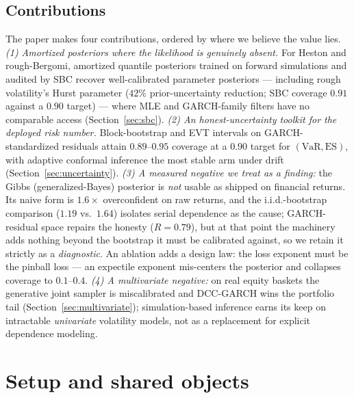 \documentclass[11pt]{article}
\newcommand{\VaR}{\mathrm{VaR}}
\newcommand{\ES}{\mathrm{ES}}
\theoremstyle{remark}
\begin{document}
\subsection{Contributions}\label{sec:contributions}
The paper makes four contributions, ordered by where we believe the value
lies. \emph{(1) Amortized posteriors where the likelihood is genuinely
absent.} For Heston and rough-Bergomi, amortized quantile posteriors
trained on forward simulations and audited by SBC recover well-calibrated
parameter posteriors --- including rough volatility's Hurst parameter
($42\%$ prior-uncertainty reduction; SBC coverage $0.91$ against a $0.90$
target) --- where MLE and GARCH-family filters have no comparable access
(Section~\ref{sec:sbc}). \emph{(2) An honest-uncertainty toolkit for the
deployed risk number.} Block-bootstrap and EVT intervals on
GARCH-standardized residuals attain $0.89$--$0.95$ coverage at a $0.90$
target for $(\VaR,\ES)$, with adaptive conformal inference the most
stable arm under drift (Section~\ref{sec:uncertainty}). \emph{(3) A
measured negative we treat as a finding:} the Gibbs (generalized-Bayes)
posterior is \emph{not} usable as shipped on financial returns. Its naive
form is $1.6\times$ overconfident on raw returns, and the i.i.d.-bootstrap
comparison ($1.19$ vs.\ $1.64$) isolates serial dependence as the cause;
GARCH-residual space repairs the honesty ($R = 0.79$), but at that point
the machinery adds nothing beyond the bootstrap it must be calibrated
against, so we retain it strictly as a \emph{diagnostic}. An ablation adds
a design law: the loss exponent must be the pinball loss --- an expectile
exponent mis-centers the posterior and collapses coverage to $0.1$--$0.4$.
\emph{(4) A multivariate negative:} on real equity baskets the generative
joint sampler is miscalibrated and DCC-GARCH wins the portfolio tail
(Section~\ref{sec:multivariate}); simulation-based inference earns its
keep on intractable \emph{univariate} volatility models, not as a
replacement for explicit dependence modeling.


\section{Setup and shared objects}\label{sec:setup}
\end{document}
